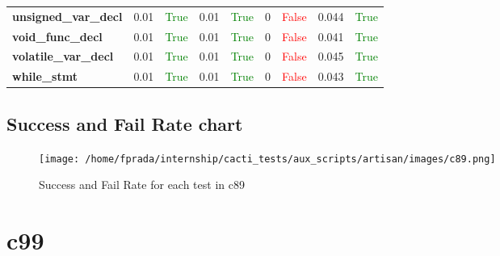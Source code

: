 \documentclass{article}
\begin{document}
\begin{xltabular}{\textwidth}{lcccccccc}
\textbf{{\fontsize{10}{12}\selectfont unsigned\_var\_decl}}& 0.01&\textcolor{green}{True}& 0.01&\textcolor{green}{True}& 0&\textcolor{red}{False}& 0.044&\textcolor{green}{True} \\[0.5ex]
\textbf{{\fontsize{10}{12}\selectfont void\_func\_decl}}& 0.01&\textcolor{green}{True}& 0.01&\textcolor{green}{True}& 0&\textcolor{red}{False}& 0.041&\textcolor{green}{True} \\[0.5ex]
\textbf{{\fontsize{10}{12}\selectfont volatile\_var\_decl}}& 0.01&\textcolor{green}{True}& 0.01&\textcolor{green}{True}& 0&\textcolor{red}{False}& 0.045&\textcolor{green}{True} \\[0.5ex]
\textbf{{\fontsize{10}{12}\selectfont while\_stmt}}& 0.01&\textcolor{green}{True}& 0.01&\textcolor{green}{True}& 0&\textcolor{red}{False}& 0.043&\textcolor{green}{True} \\[0.5ex]
\bottomrule
\end{xltabular}
\newpage
\subsection{Success and Fail Rate chart}
\begin{figure}[h!]
\centering
\texttt{[image: /home/fprada/internship/cacti\_tests/aux\_scripts/artisan/images/c89.png]}
\caption{Success and Fail Rate for each test in c89}
\label{fig:c89}
\end{figure}
\newpage
\section{c99}
\end{document}
